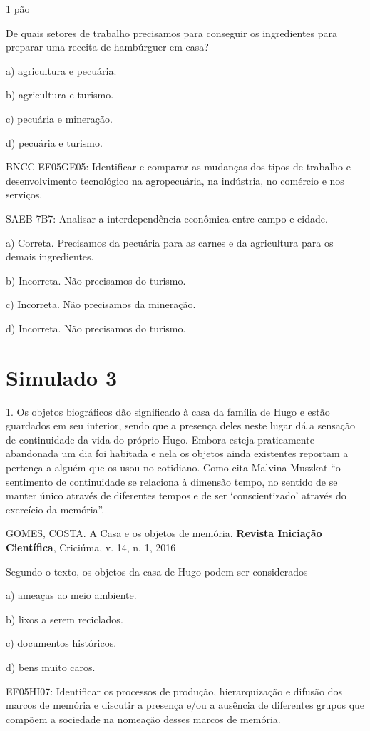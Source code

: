 1 pão

De quais setores de trabalho precisamos para conseguir os ingredientes
para preparar uma receita de hambúrguer em casa?

a) agricultura e pecuária.

b) agricultura e turismo.

c) pecuária e mineração.

d) pecuária e turismo.

BNCC EF05GE05: Identificar e comparar as mudanças dos tipos de trabalho
e desenvolvimento tecnológico na agropecuária, na indústria, no comércio
e nos serviços.

SAEB 7B7: Analisar a interdependência econômica entre campo e cidade.

a) Correta. Precisamos da pecuária para as carnes e da agricultura para
os demais ingredientes.

b) Incorreta. Não precisamos do turismo.

c) Incorreta. Não precisamos da mineração.

d) Incorreta. Não precisamos do turismo.

\section{Simulado 3}\label{simulado-3}

1. Os objetos biográficos dão significado à casa da família de Hugo e
estão guardados em seu interior, sendo que a presença deles neste lugar
dá a sensação de continuidade da vida do próprio Hugo. Embora esteja
praticamente abandonada um dia foi habitada e nela os objetos ainda
existentes reportam a pertença a alguém que os usou no cotidiano. Como
cita Malvina Muszkat ``o sentimento de continuidade se relaciona à
dimensão tempo, no sentido de se manter único através de diferentes
tempos e de ser `conscientizado' através do exercício da memória''.

GOMES, COSTA. A Casa e os objetos de memória. \textbf{Revista Iniciação
Científica}, Criciúma, v. 14, n. 1, 2016

Segundo o texto, os objetos da casa de Hugo podem ser considerados

a) ameaças ao meio ambiente.

b) lixos a serem reciclados.

c) documentos históricos.

d) bens muito caros.

EF05HI07: Identificar os processos de produção, hierarquização e difusão
dos marcos de memória e discutir a presença e/ou a ausência de
diferentes grupos que compõem a sociedade na nomeação desses marcos de
memória.

